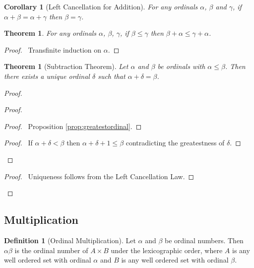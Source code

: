 \documentclass{book}
\let\qed\relax
\newtheorem{cor}{Corollary}[ax]
\newtheorem{thm}[ax]{Theorem}
\theoremstyle{definition}
\newtheorem{df}[ax]{Definition}
\begin{document}
\begin{cor}[Left Cancellation for Addition]
For any ordinals $\alpha$, $\beta$ and $\gamma$, if $\alpha + \beta = \alpha + \gamma$ then $\beta = \gamma$.
\end{cor}

\begin{thm}
For any ordinals $\alpha$, $\beta$, $\gamma$, if $\beta \leq \gamma$ then $\beta + \alpha \leq \gamma + \alpha$.
\end{thm}

\begin{proof}
\pf\ Transfinite induction on $\alpha$. \qed
\end{proof}

\begin{thm}[Subtraction Theorem]
Let $\alpha$ and $\beta$ be ordinals with $\alpha \leq \beta$. Then there exists a unique ordinal $\delta$ such that $\alpha + \delta = \beta$.
\end{thm}

\begin{proof}
\pf
{}
\begin{proof}
	\begin{proof}
		\pf\ Proposition \ref{prop:greatestordinal}.
	\end{proof}
	\begin{proof}
		\pf\ If $\alpha + \delta < \beta$ then $\alpha + \delta + 1 \leq \beta$ contradicting the greatestness of $\delta$.
	\end{proof}
\end{proof}
\qedstep
\begin{proof}
	\pf\ Uniqueness follows from the Left Cancellation Law.
\end{proof}
\qed
\end{proof}

\subsection{Multiplication}

\begin{df}[Ordinal Multiplication]
Let $\alpha$ and $\beta$ be ordinal numbers. Then $\alpha \beta$ is the ordinal number of $A \times B$ under the lexicographic order, where $A$ is any well ordered set with ordinal $\alpha$ and $B$ is any well ordered set with ordinal $\beta$.
\end{df}
\end{document}
